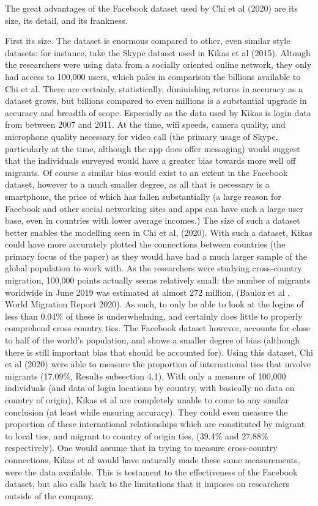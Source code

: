 \documentclass[12pt]{article}
\begin{document}
The great advantages of the Facebook dataset used by Chi et al (2020) are its size, 
its detail, and its frankness. 

First its size. The dataset is enormous compared to other, even similar style datasets: 
for instance, take the Skype dataset used in Kikas et al (2015). Altough the researchers 
were using data from a socially oriented online network, they only had access to 100,000 
users, which pales in comparison the billions available to Chi et al. There are 
certainly, statistically, diminishing returns in accuracy as a dataset grows, but billions 
compared to even millions is a substantial upgrade in accuracy and breadth of scope. 
Especially as the data used by Kikas is login data from between 2007 and 2011. At the time, 
wifi speeds, camera quality, and microphone quality necessary for video call (the primary 
usage of Skype, particularly at the time, although the app does offer messaging) would
suggest that the individuals surveyed would have a greater bias towards more well off 
migrants. Of course a similar bias would exist to an extent in the Facebook dataset, 
however to a much smaller degree, as all that is necessary is a smartphone, the price of 
which has fallen substantially (a large reason for Facebook and other social networking 
sites and apps can have such a large user base, even in countries with lower average incomes.)
The size of such a dataset better enables the modelling seen in Chi et al, (2020). With such 
a dataset, Kikas could have more accurately plotted the connections between countries (the 
primary focus of the paper) as they would have had a much larger sample of the global 
population to work with. As the researchers were studying cross-country migration, 
100,000 points actually seems relatively small: the number of migrants worldwide in June 2019
was estimated at almost 272 million, (Bauloz et al , World Migration Report 2020). As such, 
to only be able to look at the logins of less than 0.04\% of these is underwhelming, 
and certainly does little to properly comprehend cross country ties. The Facebook dataset 
however, accounts for close to half of the world's population, and shows a smaller degree 
of bias (although there is still important bias that should be accounted for). Using this 
dataset, Chi et al (2020) were able to measure the proportion of international ties that 
involve migrants (17.09\%, Results subsection 4.1). With only a measure of 100,000 
individuals (and data of login locations by country, with basically no data on country 
of origin), Kikas et al are completely unable to come to any similar conclusion (at least 
while ensuring accuracy). They could even measure the proportion of these international 
relationships which are constituted by migrant to local ties, and migrant to country of origin 
ties, (39.4\% and 27.88\% respectively). One would assume that in trying to measure cross-country 
connections, Kikas et al would have naturally made these same measurements, were the data 
available. This is testament to the effectiveness of the Facebook dataset, but also calls back 
to the limitations that it imposes on researchers outside of the company. 
\end{document}
